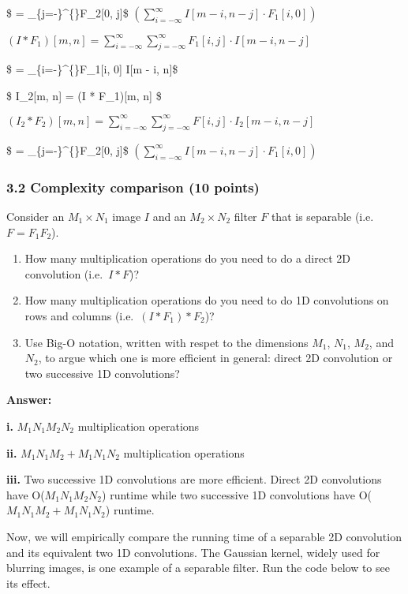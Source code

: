 \documentclass[11pt]{article}
\providecommand{\tightlist}{%
      \setlength{\itemsep}{0pt}\setlength{\parskip}{0pt}}
\begin{document}
\$ = \sum\_\{j=-\infty\}\^{}\{\infty\}F\_2{[}0, j{]}\$
\((\sum_{i=-\infty}^{\infty}I[m - i, n - j] \cdot F_1[i, 0])\)

\((I * F_1)[m, n] = \sum_{i=-\infty}^{\infty}\sum_{j=-\infty}^{\infty}F_1[i, j] \cdot I[m - i, n - j]\)

\$ = \sum\_\{i=-\infty\}\^{}\{\infty\}F\_1{[}i, 0{]} \cdot I{[}m - i,
n{]}\$

\$ I\_2{[}m, n{]} = (I * F\_1){[}m, n{]} \$

\((I_2 * F_2)[m, n] = \sum_{i=-\infty}^{\infty}\sum_{j=-\infty}^{\infty}F[i, j] \cdot I_2[m - i, n - j]\)

\$ = \sum\_\{j=-\infty\}\^{}\{\infty\}F\_2{[}0, j{]}\$
\((\sum_{i=-\infty}^{\infty}I[m - i, n - j] \cdot F_1[i, 0])\)

    \hypertarget{complexity-comparison-10-points}{%
\subsubsection{3.2 Complexity comparison (10
points)}\label{complexity-comparison-10-points}}

Consider an \(M_1\times{N_1}\) image \(I\) and an \(M_2\times{N_2}\)
filter \(F\) that is separable (i.e.~\(F=F_1F_2\)).

\begin{enumerate}
\def\labelenumi{(\roman{enumi})}
\tightlist
\item
  How many multiplication operations do you need to do a direct 2D
  convolution (i.e.~\(I*F\))?
\item
  How many multiplication operations do you need to do 1D convolutions
  on rows and columns (i.e.~\((I*F_1)*F_2\))?
\item
  Use Big-O notation, written with respet to the dimensions \(M_1\),
  \(N_1\), \(M_2\), and \(N_2\), to argue which one is more efficient in
  general: direct 2D convolution or two successive 1D convolutions?
\end{enumerate}

    \textbf{Answer:}

\textbf{i.} \(M_1N_1M_2N_2\) multiplication operations

\textbf{ii.} \(M_1N_1M_2 + M_1N_1N_2\) multiplication operations

\textbf{iii.} Two successive 1D convolutions are more efficient. Direct
2D convolutions have O(\(M_1N_1M_2N_2\)) runtime while two successive 1D
convolutions have O(\(M_1N_1M_2 + M_1N_1N_2\)) runtime.

    Now, we will empirically compare the running time of a separable 2D
convolution and its equivalent two 1D convolutions. The Gaussian kernel,
widely used for blurring images, is one example of a separable filter.
Run the code below to see its effect.
\end{document}
